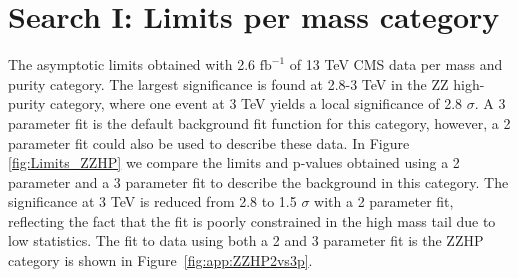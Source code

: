 \chapter{Search I: Limits per mass category}
\label{app:search1}
 The asymptotic limits obtained with 2.6 $\textrm{fb}^{-1}$ of 13 TeV CMS data per mass and purity category. The largest significance is found at 2.8-3 TeV in the ZZ high-purity category, where one event at 3 TeV yields a local significance of 2.8 $\sigma$. A 3 parameter fit is the default background fit function for this category, however, a 2 parameter fit could also be used to describe these data. In Figure \ref{fig:Limits_ZZHP} we compare the limits and p-values obtained using a 2 parameter and a 3 parameter fit to describe the background in this category. The significance at 3 TeV is reduced from 2.8 to 1.5 $\sigma$ with a 2 parameter fit, reflecting the fact that the fit is poorly constrained in the high mass tail due to low statistics. The fit to data using both a 2 and 3 parameter fit is the ZZHP category is shown in Figure~\ref{fig:app:ZZHP2vs3p}.

